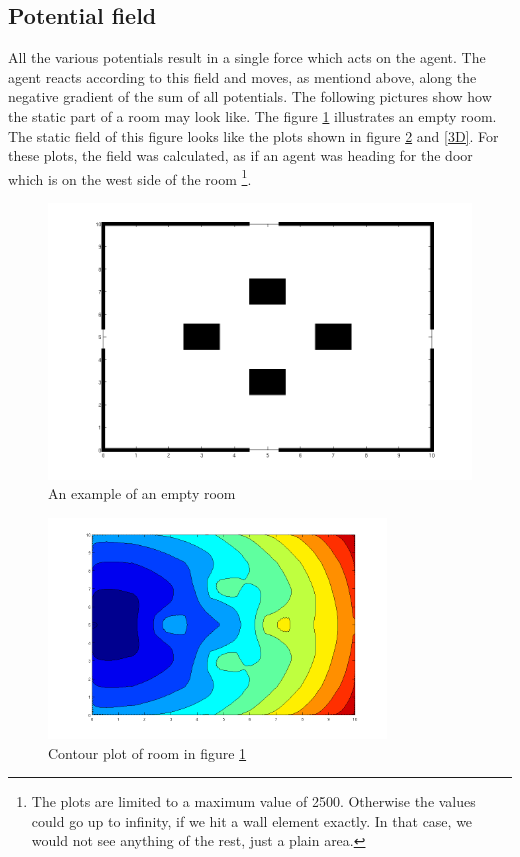 \subsection{Potential field}
All the various potentials result in a single force which acts on the agent.
The agent reacts according to this field and moves, as mentiond
above, along the negative gradient of the sum of all potentials.
The following pictures show how the static part of a room may look
like. The figure \ref{emptyRoom} illustrates an empty room. The static field of
this figure looks like the plots shown in figure \ref{contour} and \ref{3D}.
For these plots, the field was calculated, as if an agent was
heading for the door which is on the west side of the room \footnote{The plots
are limited to a maximum value of 2500. Otherwise the values could go up to 
infinity, if we hit a wall element exactly. In that case, we would not see
anything of the rest, just a plain area.}.
\begin{figure}
	\includegraphics[width=\textwidth]{../graphen/emptyRoom.png}
	\caption{An example of an empty room}
	\label{emptyRoom}
\end{figure}
\begin{figure}
	\centering
	\includegraphics[width=0.8\textwidth]{../graphen/contour.png}
	\caption{Contour plot of room in figure \ref{emptyRoom}}
	\label{contour}
\end{figure}
